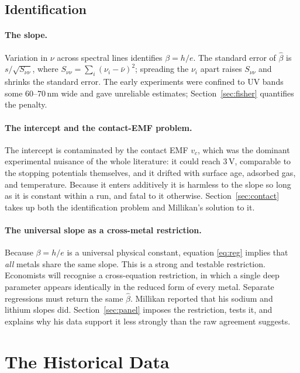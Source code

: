 \documentclass[12pt]{article}
\begin{document}
\subsection{Identification}

\paragraph{The slope.}
Variation in $\nu$ across spectral lines identifies $\beta = h/e$.  The
standard error of $\hat\beta$ is $s/\sqrt{S_{\nu\nu}}$, where
$S_{\nu\nu} = \sum_i(\nu_i - \bar\nu)^2$; spreading the $\nu_i$ apart raises
$S_{\nu\nu}$ and shrinks the standard error.  The early experiments were
confined to UV bands some $60$--$70$\,nm wide and gave unreliable estimates;
Section~\ref{sec:fisher} quantifies the penalty.

\paragraph{The intercept and the contact-EMF problem.}
The intercept is contaminated by the contact EMF $v_c$, which was the dominant
experimental nuisance of the whole literature: it could reach $3$\,V,
comparable to the stopping potentials themselves, and it drifted with surface
age, adsorbed gas, and temperature.  Because it enters additively it is
harmless to the slope so long as it is constant within a run, and fatal to it
otherwise.  Section~\ref{sec:contact} takes up both the identification
problem and Millikan's solution to it.

\paragraph{The universal slope as a cross-metal restriction.}
Because $\beta = h/e$ is a universal physical constant, equation
\eqref{eq:reg} implies that \emph{all} metals share the same slope.  This is
a strong and testable restriction.  Economists will recognise a
cross-equation restriction, in which a single deep parameter appears
identically in the reduced form of every metal.  Separate regressions must
return the same $\hat\beta$.  Millikan reported that his sodium and lithium
slopes did.  Section~\ref{sec:panel} imposes the restriction, tests it, and
explains why his data support it less strongly than the raw agreement
suggests.

\section{The Historical Data}
\label{sec:data}
\end{document}
